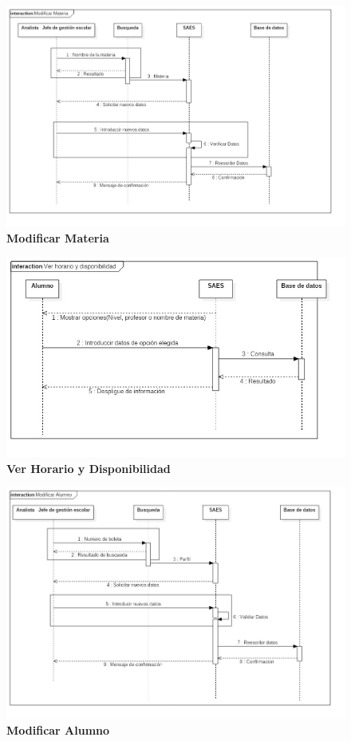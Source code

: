 \begin{figure}[H]
  \centering
    \includegraphics[scale=0.5,angle=90]{project/Secuencia/Modificar_Materia.jpg}
  \caption{\textbf{Modificar Materia}}
\end{figure}
\begin{figure}[H]
  \centering
    \includegraphics[scale=0.5,angle=90]{project/Secuencia/Ver_horario_y_disponibilidad.jpg}
  \caption{\textbf{Ver Horario y Disponibilidad}}
\end{figure}
\begin{figure}[H]
  \centering
    \includegraphics[scale=0.5,angle=90]{project/Secuencia/Modificar_Alumno.jpg}
  \caption{\textbf{Modificar Alumno}}
\end{figure}
